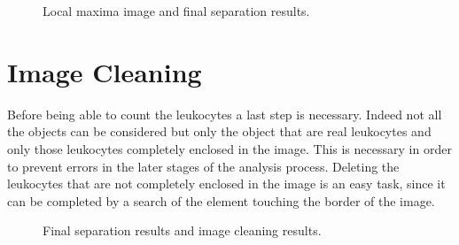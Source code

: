 \documentclass[final,a4paper,12pt,english]{UnicaPhdThesis3}
\begin{document}
	\begin{figure}[!htbp]
		\centering
		\caption{\label{fig:example12}Local maxima image and final separation results. }
	\end{figure}
	
	\section{Image Cleaning}
	Before being able to count the leukocytes a last step is necessary. Indeed not all the objects can be considered but only the object that are real leukocytes and only those leukocytes completely enclosed in the image. This is necessary in order to prevent errors in the later stages of the analysis process. Deleting the leukocytes that are not completely enclosed in the image is an easy task, since it can be completed by a search of the element touching the border of the image. 
	
	\begin{figure}[!htbp]
		\centering
		\caption{\label{fig:example13}Final separation results and image cleaning results.}
	\end{figure}
	
\end{document}
